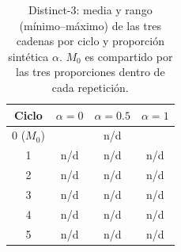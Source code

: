 
\begin{table}[ht]
\centering
\footnotesize
\begin{tabular}{c c c c}
\hline
Ciclo & $\alpha=0$ & $\alpha=0.5$ & $\alpha=1$ \\
\hline
0 ($M_0$) & \multicolumn{3}{c}{n/d} \\
1 & n/d & n/d & n/d \\
2 & n/d & n/d & n/d \\
3 & n/d & n/d & n/d \\
4 & n/d & n/d & n/d \\
5 & n/d & n/d & n/d \\
\hline
\end{tabular}
\caption{Distinct-3: media y rango (mínimo--máximo) de las tres cadenas por ciclo y proporción sintética $\alpha$. $M_0$ es compartido por las tres proporciones dentro de cada repetición.}
\label{tab:medias_distinct_3}
\end{table}
